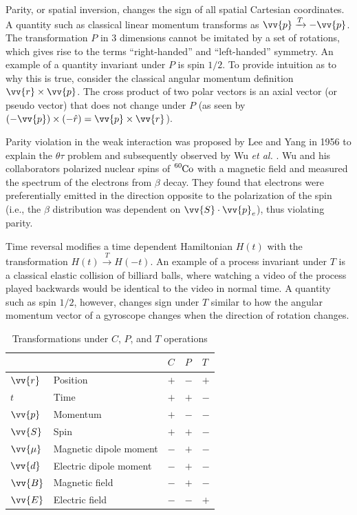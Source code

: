 Parity, or spatial inversion, changes the sign of all spatial Cartesian coordinates. A quantity such as classical linear momentum transforms as $\vv{p}\xrightarrow{T} -\vv{p}$. The transformation $P$ in 3 dimensions cannot be imitated by a set of rotations, which gives rise to the terms ``right-handed'' and ``left-handed'' symmetry. An example of a quantity invariant under $P$ is spin $1/2$. To provide intuition as to why this is true, consider the classical angular momentum definition $\vv{r} \times \vv{p}$. The cross product of two polar vectors is an axial vector (or pseudo vector) that does not change under $P$ (as seen by $(-\vv{p}) \times (-\hat{r}) = \vv{p} \times \vv{r}$).

Parity violation in the weak interaction was proposed by Lee and Yang in 1956 to explain the $\theta$\textendash$\tau$ problem and subsequently observed by Wu \textit{et al.} \cite{wu_1956, cp_violation_wo_strangeness}. Wu and his collaborators polarized nuclear spins of $\ce{^{60}Co}$ with a magnetic field and measured the spectrum of the electrons from $\beta$ decay. They found that electrons were preferentially emitted in the direction opposite to the polarization of the spin (i.e., the $\beta$ distribution was dependent on $\vv{S}\cdot\vv{p}_e$), thus violating parity.

Time reversal modifies a time dependent Hamiltonian $H(t)$ with the transformation $H(t)\xrightarrow{T} H(-t)$. An example of a process invariant under $T$ is a classical elastic collision of billiard balls, where watching a video of the process played backwards would be identical to the video in normal time. A quantity such as spin $1/2$, however, changes sign under $T$ similar to how the angular momentum vector of a gyroscope changes when the direction of rotation changes.

\begin{table}
\centering
\caption[Transformations under $C$, $P$, and $T$ operations]{\label{tb:cpt_transform}Transformations under $C$, $P$, and $T$ operations}
\begin{tabular}{lllll}
\toprule
& & $C$ & $P$ & $T$ \\ 
\midrule
$\vv{r}$ & Position & $+$ & $-$ & $+$ \\
$t$ & Time & $+$ & $+$ & $-$ \\
$\vv{p}$ & Momentum & $+$ & $-$ & $-$ \\
$\vv{S}$ & Spin & $+$ & $+$ & $-$ \\
$\vv{\mu}$ & Magnetic dipole moment  & $-$ & $+$ & $-$ \\
$\vv{d}$ & Electric dipole moment  & $-$ & $+$ & $-$ \\
$\vv{B}$ & Magnetic field  & $-$ & $+$ & $-$ \\
$\vv{E}$ & Electric field & $-$ & $-$ & $+$ \\
\bottomrule
\end{tabular}
\end{table}

